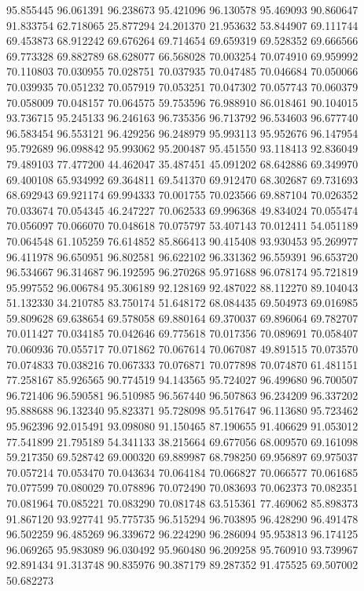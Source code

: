95.855445
96.061391
96.238673
95.421096
96.130578
95.469093
90.860647
91.833754
62.718065
25.877294
24.201370
21.953632
53.844907
69.111744
69.453873
68.912242
69.676264
69.714654
69.659319
69.528352
69.666566
69.773328
69.882789
68.628077
66.568028
70.003254
70.074910
69.959992
70.110803
70.030955
70.028751
70.037935
70.047485
70.046684
70.050066
70.039935
70.051232
70.057919
70.053251
70.047302
70.057743
70.060379
70.058009
70.048157
70.064575
59.753596
76.988910
86.018461
90.104015
93.736715
95.245133
96.246163
96.735356
96.713792
96.534603
96.677740
96.583454
96.553121
96.429256
96.248979
95.993113
95.952676
96.147954
95.792689
96.098842
95.993062
95.200487
95.451550
93.118413
92.836049
79.489103
77.477200
44.462047
35.487451
45.091202
68.642886
69.349970
69.400108
65.934992
69.364811
69.541370
69.912470
68.302687
69.731693
68.692943
69.921174
69.994333
70.001755
70.023566
69.887104
70.026352
70.033674
70.054345
46.247227
70.062533
69.996368
49.834024
70.055474
70.056097
70.066070
70.048618
70.075797
53.407143
70.012411
54.051189
70.064548
61.105259
76.614852
85.866413
90.415408
93.930453
95.269977
96.411978
96.650951
96.802581
96.622102
96.331362
96.559391
96.653720
96.534667
96.314687
96.192595
96.270268
95.971688
96.078174
95.721819
95.997552
96.006784
95.306189
92.128169
92.487022
88.112270
89.104043
51.132330
34.210785
83.750174
51.648172
68.084435
69.504973
69.016985
59.809628
69.638654
69.578058
69.880164
69.370037
69.896064
69.782707
70.011427
70.034185
70.042646
69.775618
70.017356
70.089691
70.058407
70.060936
70.055717
70.071862
70.067614
70.067087
49.891515
70.073570
70.074833
70.038216
70.067333
70.076871
70.077898
70.074870
61.481151
77.258167
85.926565
90.774519
94.143565
95.724027
96.499680
96.700507
96.721406
96.590581
96.510985
96.567440
96.507863
96.234209
96.337202
95.888688
96.132340
95.823371
95.728098
95.517647
96.113680
95.723462
95.962396
92.015491
93.098080
91.150465
87.190655
91.406629
91.053012
77.541899
21.795189
54.341133
38.215664
69.677056
68.009570
69.161098
59.217350
69.528742
69.000320
69.889987
68.798250
69.956897
69.975037
70.057214
70.053470
70.043634
70.064184
70.066827
70.066577
70.061685
70.077599
70.080029
70.078896
70.072490
70.083693
70.062373
70.082351
70.081964
70.085221
70.083290
70.081748
63.515361
77.469062
85.898373
91.867120
93.927741
95.775735
96.515294
96.703895
96.428290
96.491478
96.502259
96.485269
96.339672
96.224290
96.286094
95.953813
96.174125
96.069265
95.983089
96.030492
95.960480
96.209258
95.760910
93.739967
92.891434
91.313748
90.835976
90.387179
89.287352
91.475525
69.507002
50.682273
